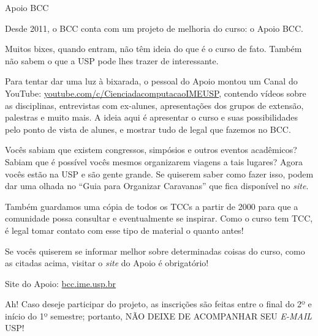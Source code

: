 \begin{subsubsecao}{Apoio BCC}

Desde 2011, o BCC conta com um projeto de melhoria do curso: o Apoio BCC.

Muitos bixes, quando entram, não têm ideia do que é o curso de fato. Também não
sabem o que a USP pode lhes trazer de interessante.

Para tentar dar uma luz à bixarada, o pessoal do Apoio montou um Canal do YouTube:
\url{youtube.com/c/CienciadacomputacaoIMEUSP}, contendo vídeos sobre as disciplinas,
entrevistas com ex-alunes, apresentações dos grupos de extensão, palestras e muito
mais. A ideia aqui é apresentar o curso e suas possibilidades pelo ponto de vista
de alunes, e mostrar tudo de legal que fazemos no BCC.

Vocês sabiam que existem congressos, simpósios e outros eventos acadêmicos?
Sabiam que é possível vocês mesmos organizarem viagens a tais lugares? Agora
vocês estão na USP e são gente grande. Se quiserem saber como fazer isso, podem 
dar uma olhada no ``Guia para Organizar Caravanas'' que fica disponível 
no \textit{site}.

Também guardamos uma cópia de todos os TCCs a partir de 2000 para que a 
comunidade possa consultar e eventualmente se inspirar. Como o curso tem TCC, é 
legal tomar contato com esse tipo de material o quanto antes!

Se vocês quiserem se informar melhor sobre determinadas coisas do curso, como as
citadas acima, visitar o \textit{site} do Apoio é obrigatório!

Site do Apoio: \url{bcc.ime.usp.br}

Ah! Caso deseje participar do projeto, as inscrições são feitas entre
o final do 2º e início do 1º semestre; portanto, NÃO DEIXE DE ACOMPANHAR SEU
\textit{E-MAIL} USP!

\end{subsubsecao}
